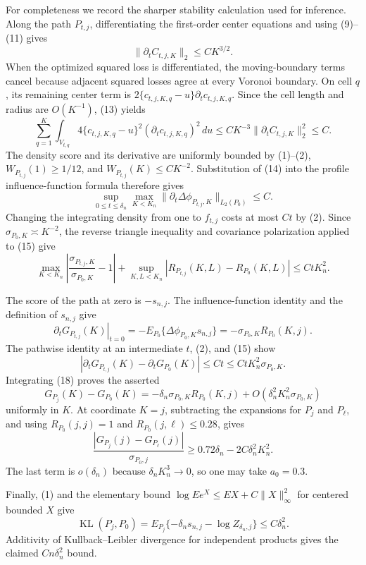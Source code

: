 For completeness we record the sharper stability calculation used for inference.  Along the path \(P_{t,j}\), differentiating the first-order center equations and using (9)--(11) gives
\[
 \|\partial_tC_{t,j,K}\|_2\leq CK^{3/2}.                                      \tag{13}
\]
When the optimized squared loss is differentiated, the moving-boundary terms cancel because adjacent squared losses agree at every Voronoi boundary.  On cell \(q\), its remaining center term is \(2\{c_{t,j,K,q}-u\}\partial_tc_{t,j,K,q}\).  Since the cell length and radius are \(O(K^{-1})\), (13) yields
\[
 \sum_{q=1}^K\int_{V_{t,q}}
 4\{c_{t,j,K,q}-u\}^2(\partial_tc_{t,j,K,q})^2\,du
 \leq CK^{-3}\|\partial_tC_{t,j,K}\|_2^2\leq C.                               \tag{14}
\]
The density score and its derivative are uniformly bounded by (1)--(2), \(W_{P_{t,j}}(1)\geq1/12\), and \(W_{P_{t,j}}(K)\leq CK^{-2}\).  Substitution of (14) into the profile influence-function formula therefore gives
\[
 \sup_{0\leq t\leq\delta_n}\max_{K<K_n}
 \|\partial_t\Delta\phi_{P_{t,j},K}\|_{L_2(P_0)}\leq C.                       \tag{15}
\]
Changing the integrating density from one to \(f_{t,j}\) costs at most \(Ct\) by (2).  Since \(\sigma_{P_0,K}\asymp K^{-2}\), the reverse triangle inequality and covariance polarization applied to (15) give
\[
 \max_{K<K_n}\left|\frac{\sigma_{P_{t,j},K}}{\sigma_{P_0,K}}-1\right|
 +\sup_{K,L<K_n}|R_{P_{t,j}}(K,L)-R_{P_0}(K,L)|
 \leq CtK_n^2.                                                               \tag{16}
\]

The score of the path at zero is \(-s_{n,j}\).  The influence-function identity and the definition of \(s_{n,j}\) give
\[
 \left.\partial_tG_{P_{t,j}}(K)\right|_{t=0}
 =-E_{P_0}\{\Delta\phi_{P_0,K}s_{n,j}\}
 =-\sigma_{P_0,K}R_{P_0}(K,j).                                                \tag{17}
\]
The pathwise identity at an intermediate \(t\), (2), and (15) show
\[
 |\partial_tG_{P_{t,j}}(K)-\partial_tG_{P_0}(K)|\leq Ct
 \leq CtK_n^2\sigma_{P_0,K}.                                                 \tag{18}
\]
Integrating (18) proves the asserted
\[
 G_{P_j}(K)-G_{P_0}(K)
 =-\delta_n\sigma_{P_0,K}R_{P_0}(K,j)
 +O(\delta_n^2K_n^2\sigma_{P_0,K})                                           \tag{19}
\]
uniformly in \(K\).  At coordinate \(K=j\), subtracting the expansions for \(P_j\) and \(P_\ell\), and using \(R_{P_0}(j,j)=1\) and \(R_{P_0}(j,\ell)\leq0.28\), gives
\[
 \frac{|G_{P_j}(j)-G_{P_\ell}(j)|}{\sigma_{P_0,j}}
 \geq0.72\delta_n-2C\delta_n^2K_n^2.                                         \tag{20}
\]
The last term is \(o(\delta_n)\) because \(\delta_nK_n^3\to0\), so one may take \(a_0=0.3\).

Finally, (1) and the elementary bound \(\log E e^{X}\leq E X+C\|X\|_\infty^2\) for centered bounded \(X\) give
\[
 \operatorname{KL}(P_j,P_0)
 =E_{P_j}\{-\delta_ns_{n,j}-\log Z_{\delta_n,j}\}
 \leq C\delta_n^2.
\]
Additivity of Kullback--Leibler divergence for independent products gives the claimed \(Cn\delta_n^2\) bound.